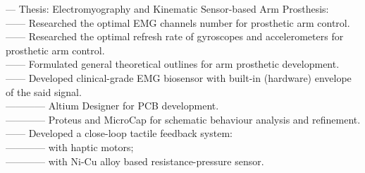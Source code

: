\begin{itemize}[leftmargin=0in, label={}]
    \small{\item{
        {— Thesis: Electromyography and Kinematic Sensor-based Arm Prosthesis:}\\
        {—— Researched the optimal EMG channels number for prosthetic arm control.}\\
        {—— Researched the optimal refresh rate of gyroscopes and accelerometers for prosthetic arm control.}\\
        {—— Formulated general theoretical outlines for arm prosthetic development.}\\
        {—— Developed clinical-grade EMG biosensor with built-in (hardware) envelope of the said signal.}\\
        {———— Altium Designer for PCB development.}\\
        {———— Proteus and MicroCap for schematic behaviour analysis and refinement.}\\
        {—— Developed a close-loop tactile feedback system:}\\
        {———— with haptic motors;}\\
        {———— with Ni-Cu alloy based resistance-pressure sensor.}
    }}
\end{itemize}